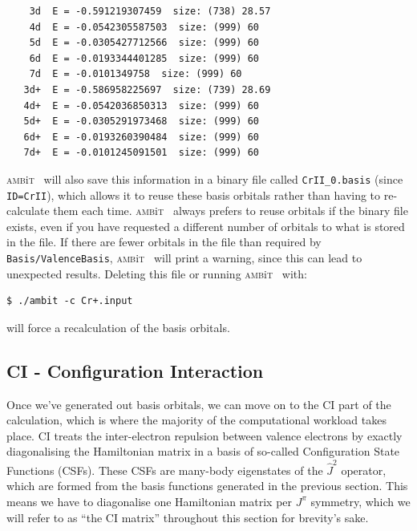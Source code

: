\documentclass{report}
\newcommand{\ambit}{\textsc{amb}{\footnotesize i}\textsc{t}}
\begin{document}
\begin{verbatim}
    3d  E = -0.591219307459  size: (738) 28.57                                 
    4d  E = -0.0542305587503  size: (999) 60                                   
    5d  E = -0.0305427712566  size: (999) 60                                   
    6d  E = -0.0193344401285  size: (999) 60                                   
    7d  E = -0.0101349758  size: (999) 60                                      
   3d+  E = -0.586958225697  size: (739) 28.69                                 
   4d+  E = -0.0542036850313  size: (999) 60                                   
   5d+  E = -0.0305291973468  size: (999) 60                                   
   6d+  E = -0.0193260390484  size: (999) 60                                   
   7d+  E = -0.0101245091501  size: (999) 60
\end{verbatim}

\ambit~ will also save this information in a binary file called \texttt{CrII\_0.basis} (since
\texttt{ID=CrII}), which allows it to reuse these basis orbitals rather than having to re-calculate them
each time. \ambit~ always prefers to reuse orbitals if the binary file exists, even if you have
requested a different number of orbitals to what is stored in the file. If there are fewer orbitals in
the file than required by \texttt{Basis/ValenceBasis}, \ambit~ will print a warning, since this can lead
to unexpected results. Deleting this file or running \ambit~ with:

\begin{verbatim}
$ ./ambit -c Cr+.input
\end{verbatim}

will force a recalculation of the basis orbitals.

\subsection{CI - Configuration Interaction}

Once we've generated out basis orbitals, we can move on to the CI part of the calculation, which is
where the majority of the computational workload takes place. CI treats the inter-electron repulsion
between valence electrons by exactly diagonalising the Hamiltonian matrix in a basis of so-called
Configuration State Functions (CSFs). These CSFs are many-body eigenstates of the $\hat{J}^2$
operator, which are formed from the basis functions generated in the previous section. This means we
have to diagonalise one Hamiltonian matrix per $J^{\pi}$ symmetry, which we will refer to as ``the CI 
matrix'' throughout this section for brevity's sake.
\end{document}
